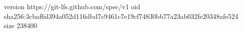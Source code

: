 version https://git-lfs.github.com/spec/v1
oid sha256:3cbaf6d394a052d116dbd7c9461c7e19cf74830bb77a23ab032fe20348afe524
size 238400
